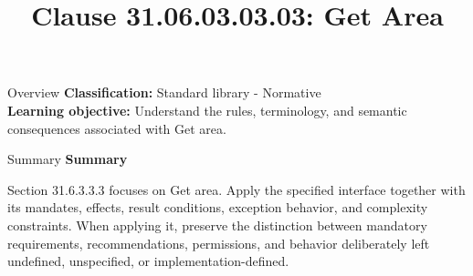 \documentclass[10pt,letterpaper]{article}
\title{Clause 31.06.03.03.03: Get Area}
\author{}
\date{}
\begin{document}
\maketitle
\begin{CornellOverviewBox}{Overview}
\textbf{Classification:} Standard library - Normative\\[2pt]
\textbf{Learning objective:} Understand the rules, terminology, and semantic consequences associated with Get area.
\end{CornellOverviewBox}\begin{CornellSummaryBox}{Summary}
{\sffamily\bfseries\color{Accent} Summary}\par\vspace{3pt}Section 31.6.3.3.3 focuses on Get area. Apply the specified interface together with its mandates, effects, result conditions, exception behavior, and complexity constraints. When applying it, preserve the distinction between mandatory requirements, recommendations, permissions, and behavior deliberately left undefined, unspecified, or implementation-defined.
\end{CornellSummaryBox}
\end{document}
